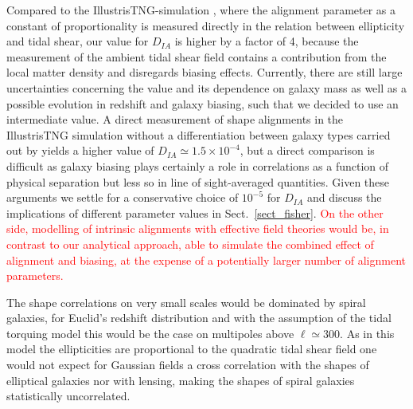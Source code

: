 \documentclass[a4paper,fleqn,usenatbib]{mnras}
\newcommand\spirou[1]{\textcolor{red}{#1}}
\begin{document}
Compared to the IllustrisTNG-simulation \citep{Zjupa_tng_2020}, where the alignment parameter as a constant of proportionality is measured directly in the relation between ellipticity and tidal shear, our value for $D_{IA}$ is higher by a factor of 4, because the measurement of the ambient tidal shear field contains a contribution from the local matter density and disregards biasing effects. Currently, there are still large uncertainties concerning the value and its dependence on galaxy mass as well as a possible evolution in redshift and galaxy biasing, such that we decided to use an intermediate value. A direct measurement of shape alignments in the IllustrisTNG simulation without a differentiation between galaxy types carried out by \citet{hilbert_intrinsic_2016} yields a higher value of $D_{IA}\simeq1.5\times10^{-4}$, but a direct comparison is difficult as galaxy biasing plays certainly a role in correlations as a function of physical separation but less so in line of sight-averaged quantities. Given these arguments we settle for a conservative choice of $10^{-5}$ for $D_{IA}$ and discuss the implications of different parameter values in Sect.~\ref{sect_fisher}. \spirou{On the other side, modelling of intrinsic alignments with effective field theories \citep{Blazek:2017wbz,fang_fast-pt_2017} would be, in contrast to our analytical approach, able to simulate the combined effect of alignment and biasing, at the expense of a potentially larger number of alignment parameters.}

The shape correlations on very small scales would be dominated by spiral galaxies, for Euclid's redshift distribution and with the assumption of the tidal torquing model this would be the case on multipoles above $\ell\simeq 300$. As in this model the ellipticities are proportional to the quadratic tidal shear field one would not expect for Gaussian fields a cross correlation with the shapes of elliptical galaxies nor with lensing, making the shapes of spiral galaxies statistically uncorrelated.
\end{document}
